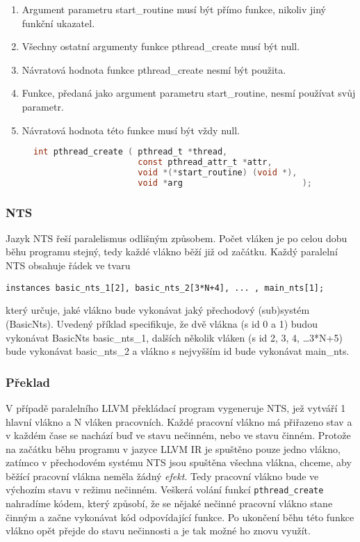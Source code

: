 \documentclass[10pt,a4paper,notitlepage]{report}
\begin{document}
\begin{enumerate}
\item Argument parametru start\_routine musí být přímo funkce, nikoliv jiný funkční ukazatel.
\item Všechny ostatní argumenty funkce pthread\_create musí být null.
\item Návratová hodnota funkce pthread\_create nesmí být použita.
\item Funkce, předaná jako argument parametru start\_routine, nesmí používat svůj parametr.
\item Návratová hodnota této funkce musí být vždy null.
\end{enumerate}

\begin{figure}[h!]
\begin{lstlisting}[language=C]
int pthread_create ( pthread_t *thread,
                     const pthread_attr_t *attr,
                     void *(*start_routine) (void *),
                     void *arg                        );
\end{lstlisting}
\end{figure}

\subsubsection{NTS}
Jazyk NTS řeší paralelismus odlišným způsobem. Počet vláken je po celou dobu běhu programu stejný, tedy každé vlákno běží již od začátku. Každý paralelní NTS obsahuje řádek  ve tvaru
\begin{lstlisting}
instances basic_nts_1[2], basic_nts_2[3*N+4], ... , main_nts[1];
\end{lstlisting}
který určuje, jaké vlákno bude vykonávat jaký přechodový (sub)systém (BasicNts). Uvedený příklad specifikuje, že dvě vlákna (s id 0 a 1) budou vykonávat BasicNts basic\_nts\_1, dalších několik vláken (s id 2, 3, 4, \ldots 3*N+5) bude vykonávat basic\_nts\_2 a vlákno s nejvyšším id bude vykonávat main\_nts.

\subsubsection{Překlad}
V případě paralelního LLVM překládací program vygeneruje NTS, jež vytváří 1 hlavní vlákno a N vláken pracovních. Každé pracovní vlákno má přiřazeno stav a v každém čase se nachází buď ve stavu nečinném, nebo ve stavu činném. Protože na začátku běhu programu v jazyce LLVM IR je spuštěno pouze jedno vlákno, zatímco v přechodovém systému NTS jsou spuštěna všechna vlákna, chceme, aby běžící pracovní vlákna neměla žádný \textit{efekt}. Tedy pracovní vlákno bude ve výchozím stavu v režimu nečinném. Veškerá volání funkcí \texttt{pthread\_create} nahradíme kódem, který způsobí, že se nějaké nečinné pracovní vlákno stane činným a začne vykonávat kód odpovídající funkce. Po ukončení běhu této funkce vlákno opět přejde do stavu nečinnosti a je tak možné ho znovu využít.
\end{document}
